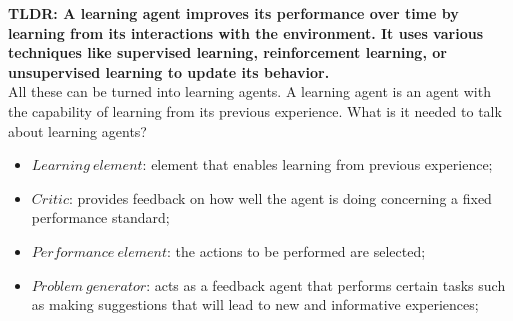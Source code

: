 \documentclass{article}
\begin{document}
\textbf{TLDR: A learning agent improves its performance over time by learning from its interactions with the environment. It uses various techniques like supervised learning, reinforcement learning, or unsupervised learning to update its behavior.} \\

All these can be turned into learning agents. A learning agent is an agent with the capability of learning from its previous experience. What is it needed to talk about learning agents?

\begin{itemize}
    \item $Learning\ element$: element that enables learning from previous experience;
    \item $Critic$: provides feedback on how well the agent is doing concerning a fixed performance standard;
    \item $Performance\ element$: the actions to be performed are selected;
    \item $Problem\ generator$: acts as a feedback agent that performs certain tasks such as making suggestions that will lead to new and informative experiences;
\end{itemize}
\end{document}
